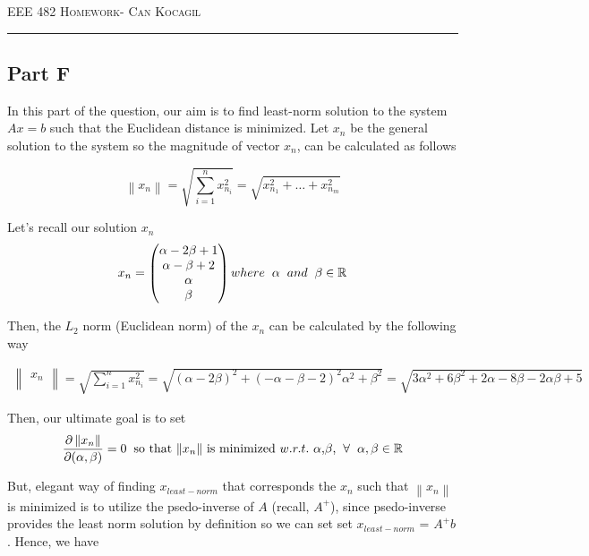 \documentclass[12pt]{amsart}
\newcommand\norm[1]{\left\lVert#1\right\rVert}
\begin{document}
\newpage
{\scshape EEE 482} \hfill {\scshape \large  Homework-\relax} \hfill {\scshape Can Kocagil}
\smallskip
\hrule

\subsection{Part F}
In this part of the question, our aim is to find least-norm solution to the system $Ax=b$ such that the Euclidean distance is minimized. Let $x_n$ be the general solution to the system so the magnitude of vector $x_n$, can be calculated as follows


\begin{equation}
 \norm{x_n}  = \sqrt{\sum_{i=1}^n x_{n_i}^2} = \sqrt{x_{n_1}^2 + \hdots + x_{n_m}^2}
\end{equation}

Let’s recall our solution $x_n$
\[ x_n = 
\begin{pmatrix}
 \alpha - 2\beta + 1\\ 
 \alpha - \beta + 2\\ 
 \alpha \\
 \beta
\end{pmatrix} where \hspace{2mm} \alpha \hspace{2mm} and \hspace{2mm} \beta \in \mathbb{R}
\]

Then, the $L_2$ norm (Euclidean norm) of the $x_n$ can be calculated by the following way


\begin{align*}
    \begin{Vmatrix}
    x_n\\
    \end{Vmatrix}  = \sqrt{\sum_{i=1}^n x_{n_i}^2} = \sqrt{(\alpha-2\beta)^2 + (-\alpha - \beta - 2)^2 \alpha^2 + \beta^2} = \sqrt{3\alpha^2 + 6\beta^2 + 2\alpha - 8\beta - 2\alpha\beta + 5}
\end{align*}

Then, our ultimate goal is to set
\begin{equation}
\frac{\partial \norm{x_n}}{\partial (\alpha,\beta)} = 0 \hspace{2mm} \text{so that $\norm{x_n}$ is minimized $w.r.t.$ $\alpha$,$\beta$,} \hspace{2mm} \forall \hspace{2mm} \alpha,\beta \in \mathbb{R}
\end{equation}


But, elegant way of finding $x_{least-norm}$ that corresponds the $x_n$ such that $\norm{x_n}$ is minimized is to utilize the psedo-inverse of $A$ (recall, $A^+$), since psedo-inverse provides the least norm solution by definition  so we can set set $x_{least-norm}$ = $A^+ b$. Hence, we have
\end{document}
